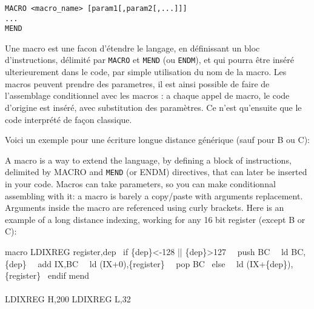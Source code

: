 \subsubsection{}\label{MACRO}
\begin{verbatim}
MACRO <macro_name> [param1[,param2[,...]]]
...
MEND
\end{verbatim}

\begin{xfr}
Une macro est une facon d'étendre le langage, en définissant un bloc d'instructions, délimité par \texttt{MACRO} et \texttt{MEND} (ou \texttt{ENDM}), et qui pourra être inséré ulterieurement dans le code, par simple utilisation du nom de la macro.
Les macros peuvent prendre des parametres, il est ainsi possible de faire de l'assemblage conditionnel avec les macros : a  chaque appel de macro, le code d'origine est inséré, avec substitution des paramètres. Ce n'est qu'ensuite que le code interprété de façon classique.

Voici un exemple pour une écriture longue distance générique (sauf pour B ou C):

\end{xfr}

\begin{xen}
A macro is a way to extend the language, by defining a block of instructions, delimited by MACRO and \texttt{MEND} (or ENDM) directives, that can later be inserted in your code.
Macros can take parameters, so you can make conditionnal assembling with it: a macro is barely a copy/paste with arguments replacement. Arguments inside the macro are referenced using curly brackets. Here is an example of a long distance indexing, working for any 16 bit register (except B or C):
\end{xen}

\begin{code}
macro LDIXREG register,dep
\ if \{dep\}\textless-128 || \{dep\}\textgreater127
\ \ push BC
\ \ ld BC,\{dep\}
\ \ add IX,BC
\ \ ld (IX+0),\{register\}
\ \ pop BC
\ else
\ \ ld (IX+\{dep\}),\{register\}
\ endif
mend
\end{code}

\paragraph{}

\begin{code}
LDIXREG H,200
LDIXREG L,32
\end{code}


